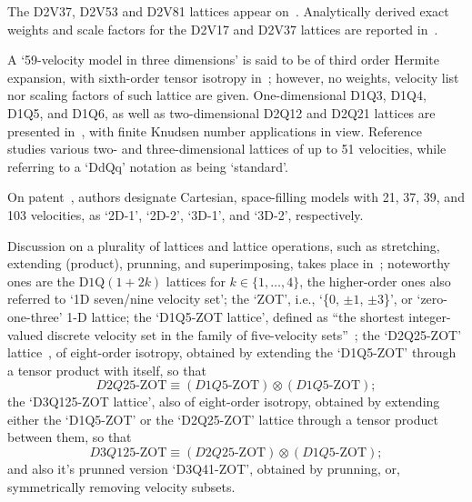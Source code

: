     The D2V37, D2V53 and D2V81 lattices appear on~\cite{2007-PhilippiPC+DosSantosLOE-IntJModPhysC}. Analytically  derived  exact
    weights and scale factors for the D2V17 and D2V37 lattices are reported in~\cite{2007-SiebertDN+PhilippiPC-IntJModPhysC}.

    A `59-velocity model in three dimensions' is said to be of third order Hermite expansion, with sixth-order  tensor  isotropy
    in~\cite{2008-ChenH+ShanX-PhysD}; however, no weights, velocity  list  nor  scaling  factors  of  such  lattice  are  given.
    One-dimensional  D1Q3,  D1Q4,  D1Q5,  and  D1Q6,  as  well  as  two-dimensional  D2Q12  and  D2Q21  lattices  are  presented
    in~\cite{2008-KimSH+BoydID-JComputPhys},      with      finite      Knudsen      number      applications      in      view.
    Reference~\cite{2008-RubinsteinR+LuoLS-PhysRev} studies various two- and three-dimensional lattices of up to 51  velocities,
    while referring to a `DdQq' notation as being `standard'.

    On patent~\cite{2008-ShanX+ZhangR-USPat}, authors designate Cartesian,  space-filling  models  with  21,  37,  39,  and  103
    velocities, as `2D-1', `2D-2', `3D-1', and `3D-2', respectively.

    Discussion on a plurality of lattices and lattice  operations,  such  as  stretching,  extending  (product),  prunning,  and
    superimposing, takes place in~\cite{2009-ChikatamarlaSS+KarlinIV-PhysRevE}; noteworthy ones are the  D$1$Q$(1+2k)$  lattices
    for $k \in \{1, \ldots, 4\}$, the higher-order ones also referred to `1D seven/nine velocity set'; the `ZOT', i.e.,  `\{$0$,
    $\pm 1$, $\pm 3$\}', or  `zero-one-three'  1-D  lattice;  the  `D1Q5-ZOT  lattice',  defined  as  ``{\swshape  the  shortest
    integer-valued        discrete        velocity        set        in        the        family        of         five-velocity
    sets\/}''~\cite{2006-ChikatamarlaSS+KarlinIV-PhysRevLett};                          the                          `D2Q25-ZOT'
    lattice~\cite{2008-ChikatamarlaSS+KarlinIV-CompPhysComm}, of eight-order isotropy,  obtained  by  extending  the  `D1Q5-ZOT'
    through a tensor product with itself, so that%
    \begin{equation}
        D2Q25\mbox{-ZOT} \equiv (D1Q5\mbox{-ZOT}) \otimes (D1Q5\mbox{-ZOT});
    \end{equation}
    \noindent the `D3Q125-ZOT lattice', also of eight-order iso\-tro\-py, obtained by extending either  the  `D1Q5-ZOT'  or  the
    `D2Q25-ZOT' lattice through a tensor product between them, so that%
    \begin{equation}
        D3Q125\mbox{-ZOT} \equiv (D2Q25\mbox{-ZOT}) \otimes (D1Q5\mbox{-ZOT});
    \end{equation}
    \noindent and also it's prunned version `D3Q41-ZOT', obtained by prunning, or, symmetrically removing velocity subsets.

